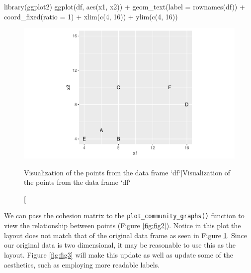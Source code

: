 \begin{Schunk}
\begin{Sinput}
library(ggplot2)
ggplot(df, aes(x1, x2)) +
  geom_text(label = rownames(df)) + 
  coord_fixed(ratio = 1) + 
  xlim(c(4, 16)) + 
  ylim(c(4, 16))
\end{Sinput}
\begin{figure}
\includegraphics{dagostino-mcgowan_files/figure-latex/fig1-1} \caption[Visualization of the points from the data frame `df`]{Visualization of the points from the data frame `df`}\label{fig:fig1}
\end{figure}
\end{Schunk}

We can pass the cohesion matrix to the
\texttt{plot\_community\_graphs()} function to view the relationship
between points (Figure \ref{fig:fig2}). Notice in this plot the layout
does not match that of the original data frame as seen in Figure
\ref{fig:fig1}. Since our original data is two dimensional, it may be
reasonable to use this as the layout. Figure \ref{fig:fig3} will make
this update as well as update some of the aesthetics, such as employing
more readable labels.

